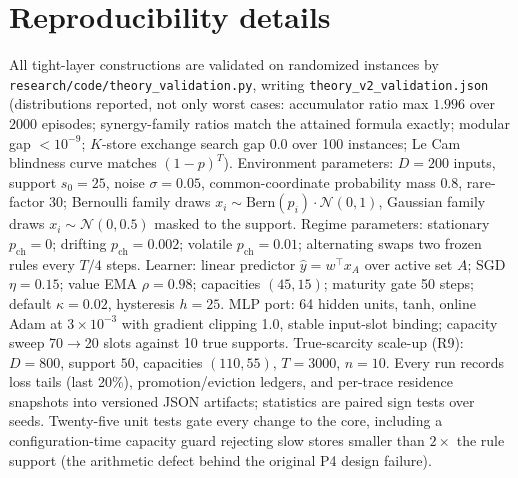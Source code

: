 \documentclass[10pt,twocolumn]{article}
\theoremstyle{definition}
\begin{document}
\section{Reproducibility details}\label{app:repro}
All tight-layer constructions are validated on randomized instances by
\texttt{research/code/theory\_validation.py}, writing
\texttt{theory\_v2\_validation.json} (distributions reported, not only worst cases:
accumulator ratio max $1.996$ over $2000$ episodes; synergy-family ratios match the
attained formula exactly; modular gap $<10^{-9}$; $K$-store exchange search gap $0.0$
over 100 instances; Le Cam blindness curve matches $(1-p)^T$).
Environment parameters: $D{=}200$ inputs, support $s_0{=}25$, noise $\sigma{=}0.05$, common-coordinate
probability mass $0.8$, rare-factor $30$; Bernoulli family draws $x_i\sim\mathrm{Bern}(p_i)\cdot
\mathcal N(0,1)$, Gaussian family draws $x_i\sim\mathcal N(0,0.5)$ masked to the support. Regime
parameters: stationary $p_{\mathrm{ch}}=0$; drifting $p_{\mathrm{ch}}=0.002$; volatile
$p_{\mathrm{ch}}=0.01$; alternating swaps two frozen rules every $T/4$ steps. Learner: linear predictor
$\hat y=w^\top x_A$ over active set $A$; {SGD} $\eta=0.15$; value {EMA} $\rho=0.98$; capacities $(45,15)$;
maturity gate 50 steps; default $\kappa=0.02$, hysteresis $h=25$. {MLP} port: 64 hidden units, tanh, online
Adam at $3\times10^{-3}$ with gradient clipping 1.0, stable input-slot binding; capacity sweep
70$\to$20 slots against 10 true supports. True-scarcity scale-up (R9): $D{=}800$, support $50$, capacities
$(110,55)$, $T{=}3000$, $n{=}10$. Every run records loss tails (last 20\%), promotion/eviction
ledgers, and per-trace residence snapshots into versioned {JSON} artifacts; statistics are paired sign tests
over seeds. Twenty-five unit tests gate every change to the core, including a configuration-time capacity
guard rejecting slow stores smaller than $2\times$ the rule support (the arithmetic defect behind the
original P4 design failure).
\end{document}
